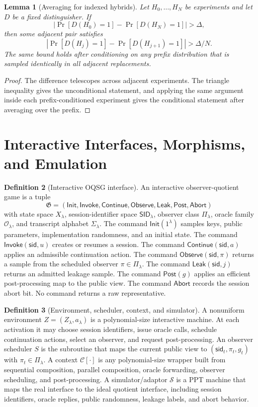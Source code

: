 \documentclass[11pt]{article}
\theoremstyle{definition}
\newtheorem{definition}{Definition}[section]
\theoremstyle{plain}
\newtheorem{lemma}[definition]{Lemma}
\theoremstyle{remark}
\newcommand{\cC}{\mathcal{C}}
\newcommand{\cO}{\mathcal{O}}
\begin{document}
\begin{lemma}[Averaging for indexed hybrids]
Let $H_0,\ldots,H_N$ be experiments and let $D$ be a fixed distinguisher. If
\[
\left|\Pr[D(H_0)=1]-\Pr[D(H_N)=1]\right|>\Delta,
\]
then some adjacent pair satisfies
\[
\left|\Pr[D(H_j)=1]-\Pr[D(H_{j+1})=1]\right|>\Delta/N.
\]
The same bound holds after conditioning on any prefix distribution that is sampled identically in all adjacent replacements.
\end{lemma}

\begin{proof}
The difference telescopes across adjacent experiments. The triangle inequality gives the unconditional statement, and applying the same argument inside each prefix-conditioned experiment gives the conditional statement after averaging over the prefix.
\end{proof}

\section{Interactive Interfaces, Morphisms, and Emulation}

\begin{definition}[Interactive OQSG interface]
An interactive observer-quotient game is a tuple
\[
\mathfrak G=(\mathsf{Init},\mathsf{Invoke},\mathsf{Continue},\mathsf{Observe},\mathsf{Leak},\mathsf{Post},\mathsf{Abort})
\]
with state space $X_\lambda$, session-identifier space $\mathsf{SID}_\lambda$, observer class $\Pi_\lambda$, oracle family $\cO_\lambda$, and transcript alphabet $\Sigma_\lambda$. The command $\mathsf{Init}(1^\lambda)$ samples keys, public parameters, implementation randomness, and an initial state. The command $\mathsf{Invoke}(\mathsf{sid},u)$ creates or resumes a session. The command $\mathsf{Continue}(\mathsf{sid},a)$ applies an admissible continuation action. The command $\mathsf{Observe}(\mathsf{sid},\pi)$ returns a sample from the scheduled observer $\pi\in\Pi_\lambda$. The command $\mathsf{Leak}(\mathsf{sid},j)$ returns an admitted leakage sample. The command $\mathsf{Post}(g)$ applies an efficient post-processing map to the public view. The command $\mathsf{Abort}$ records the session abort bit. No command returns a raw representative.
\end{definition}

\begin{definition}[Environment, scheduler, context, and simulator]
A nonuniform environment $Z=(Z_\lambda,a_\lambda)$ is a polynomial-size interactive machine. At each activation it may choose session identifiers, issue oracle calls, schedule continuation actions, select an observer, and request post-processing. An observer scheduler $S$ is the subroutine that maps the current public view to $(\mathsf{sid}_t,\pi_t,g_t)$ with $\pi_t\in\Pi_\lambda$. A context $\cC[\cdot]$ is any polynomial-size wrapper built from sequential composition, parallel composition, oracle forwarding, observer scheduling, and post-processing. A simulator/adaptor $\mathcal S$ is a PPT machine that maps the real interface to the ideal quotient interface, including session identifiers, oracle replies, public randomness, leakage labels, and abort behavior.
\end{definition}
\end{document}
